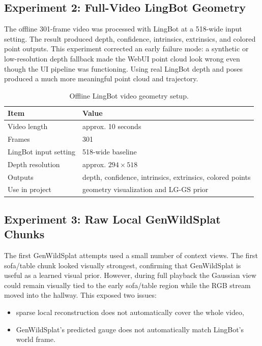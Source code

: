 \documentclass[11pt]{article}
\newcommand{\methodabbr}{LG-GS}
\newcommand{\RouteB}{\methodabbr\xspace}
\begin{document}
\subsection{Experiment 2: Full-Video LingBot Geometry}

The offline 301-frame video was processed with LingBot at a 518-wide input setting. The result produced depth, confidence, intrinsics, extrinsics, and colored point outputs. This experiment corrected an early failure mode: a synthetic or low-resolution depth fallback made the WebUI point cloud look wrong even though the UI pipeline was functioning. Using real LingBot depth and poses produced a much more meaningful point cloud and trajectory.

\begin{table}[H]
\centering
\caption{Offline LingBot video geometry setup.}
\label{tab:lingbotdata}
\begin{tabular}{@{}ll@{}}
\toprule
\textbf{Item} & \textbf{Value} \\
\midrule
Video length & approx. 10 seconds \\
Frames & 301 \\
LingBot input setting & 518-wide baseline \\
Depth resolution & approx. \(294 \times 518\) \\
Outputs & depth, confidence, intrinsics, extrinsics, colored points \\
Use in project & geometry visualization and \RouteB prior \\
\bottomrule
\end{tabular}
\end{table}

\subsection{Experiment 3: Raw Local GenWildSplat Chunks}

The first GenWildSplat attempts used a small number of context views. The first sofa/table chunk looked visually strongest, confirming that GenWildSplat is useful as a learned visual prior. However, during full playback the Gaussian view could remain visually tied to the early sofa/table region while the RGB stream moved into the hallway. This exposed two issues:

\begin{itemize}
    \item sparse local reconstruction does not automatically cover the whole video,
    \item GenWildSplat's predicted gauge does not automatically match LingBot's world frame.
\end{itemize}
\end{document}
